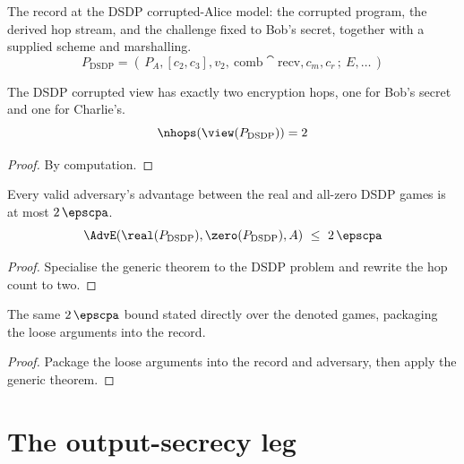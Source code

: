 \begin{definition}
  \label{def:dsdp_experiment}
  \rocqok
  The record at the DSDP corrupted-Alice model: the corrupted program, the
  derived hop stream, and the challenge fixed to Bob's secret, together with a
  supplied scheme and marshalling.
  \[ P_{\mathrm{DSDP}} = (\, P_A, [c_2,c_3], v_2,\ \mathrm{comb}\cat\mathrm{recv},
        c_m, c_r \,;\ E, \dots \,) \]
\end{definition}

\begin{lemma}
  \label{lem:dsdp_experiment_hops}
  \rocqok
  The DSDP corrupted view has exactly two encryption hops, one for Bob's secret
  and one for Charlie's.
  \[ \nhops(\view(P_{\mathrm{DSDP}})) = 2 \]
\end{lemma}
\begin{proof}
  \rocqok
  By computation.
\end{proof}

\begin{theorem}
  \label{thm:dsdp_secure}
  \rocqok
  Every valid adversary's advantage between the real and all-zero DSDP games is
  at most $2\,\epscpa$.
  \[ \AdvE(\real(P_{\mathrm{DSDP}}), \zero(P_{\mathrm{DSDP}}), A) \ \le\
        2\,\epscpa \]
\end{theorem}
\begin{proof}
  \rocqok
  Specialise the generic theorem to the DSDP problem and rewrite the hop count to
  two.
\end{proof}

\begin{corollary}
  \label{cor:dsdp_advantage_derived}
  \rocqok
  The same $2\,\epscpa$ bound stated directly over the denoted games, packaging
  the loose arguments into the record.
\end{corollary}
\begin{proof}
  \rocqok
  Package the loose arguments into the record and adversary, then apply the
  generic theorem.
\end{proof}

\part{The output-secrecy leg}


